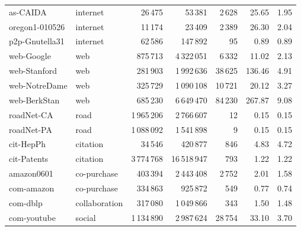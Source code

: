 \begin{table}[h]
\begin{ruledtabular}
\begin{tabular}{llrrrrr}
as-CAIDA & internet & 26\,475 & 53\,381 & 2\,628 & 25.65 & 1.95 \\
oregon1-010526 & internet & 11\,174 & 23\,409 & 2\,389 & 26.30 & 2.04 \\
p2p-Gnutella31 & internet & 62\,586 & 147\,892 & 95 & 0.89 & 0.89 \\
web-Google & web & 875\,713 & 4\,322\,051 & 6\,332 & 11.02 & 2.13 \\
web-Stanford & web & 281\,903 & 1\,992\,636 & 38\,625 & 136.46 & 4.91 \\
web-NotreDame & web & 325\,729 & 1\,090\,108 & 10\,721 & 20.12 & 3.27 \\
web-BerkStan & web & 685\,230 & 6\,649\,470 & 84\,230 & 267.87 & 9.08 \\
roadNet-CA & road & 1\,965\,206 & 2\,766\,607 & 12 & 0.15 & 0.15 \\
roadNet-PA & road & 1\,088\,092 & 1\,541\,898 & 9 & 0.15 & 0.15 \\
cit-HepPh & citation & 34\,546 & 420\,877 & 846 & 4.83 & 4.72 \\
cit-Patents & citation & 3\,774\,768 & 16\,518\,947 & 793 & 1.22 & 1.22 \\
amazon0601 & co-purchase & 403\,394 & 2\,443\,408 & 2\,752 & 2.01 & 1.58 \\
\hline
com-amazon & co-purchase & 334\,863 & 925\,872 & 549 & 0.77 & 0.74 \\
com-dblp & collaboration & 317\,080 & 1\,049\,866 & 343 & 1.50 & 1.48 \\
com-youtube & social & 1\,134\,890 & 2\,987\,624 & 28\,754 & 33.10 & 3.70 \\
\end{tabular}
\end{ruledtabular}
\end{table}
